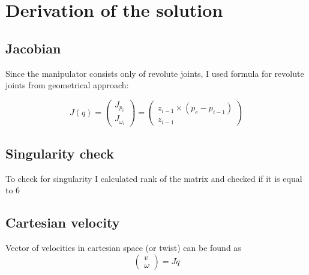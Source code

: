 \section*{Derivation of the solution}

\subsection*{Jacobian}

Since the manipulator consists only of revolute joints, I used formula for revolute joints from geometrical approach:

$$J(q) = \begin{pmatrix}
    J_{p_i} \\ J_{\omega_i}
\end{pmatrix} = \begin{pmatrix}
    z_{i - 1} \times (p_e - p_{i - 1}) \\
    z_{i - 1}
\end{pmatrix}$$

\subsection*{Singularity check}

To check for singularity I calculated rank of the matrix and checked if it is equal to 6

\subsection*{Cartesian velocity}

Vector of velocities in cartesian space (or twist) can be found as 
$$\begin{pmatrix}
    v \\ \omega
\end{pmatrix} = J \dot q $$
